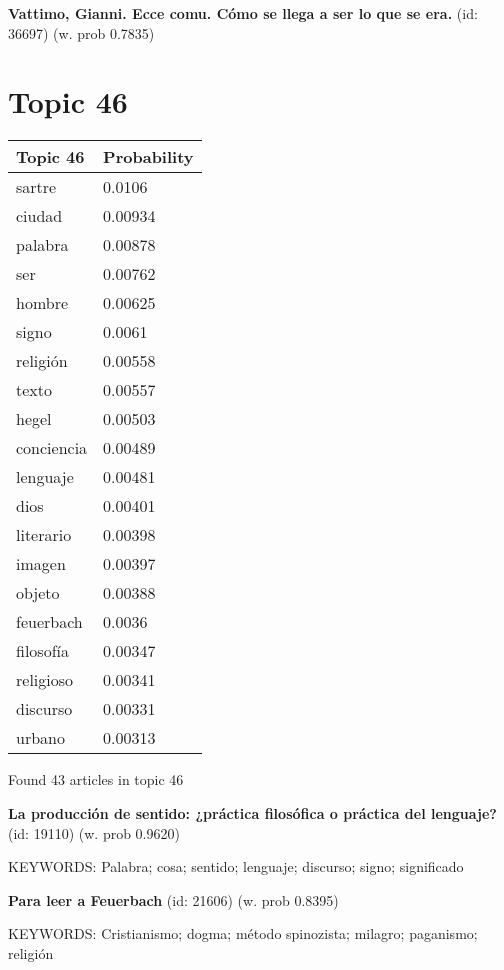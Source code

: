 \documentclass{article}
\begin{document}
\textbf{Vattimo, Gianni. Ecce comu. Cómo se llega a ser lo que se era.} (id: 36697)
 (w. prob 0.7835)

\vfill
\newpage


\centering
\thispagestyle{empty}
\section*{Topic 46}\vfill
\begin{tabular}{ll}
\toprule
   Topic 46 & Probability \\
\midrule
     sartre &      0.0106 \\
     ciudad &     0.00934 \\
    palabra &     0.00878 \\
        ser &     0.00762 \\
     hombre &     0.00625 \\
      signo &      0.0061 \\
   religión &     0.00558 \\
      texto &     0.00557 \\
      hegel &     0.00503 \\
 conciencia &     0.00489 \\
   lenguaje &     0.00481 \\
       dios &     0.00401 \\
  literario &     0.00398 \\
     imagen &     0.00397 \\
     objeto &     0.00388 \\
  feuerbach &      0.0036 \\
  filosofía &     0.00347 \\
  religioso &     0.00341 \\
   discurso &     0.00331 \\
     urbano &     0.00313 \\
\bottomrule
\end{tabular}

\vfill
Found 43 articles in topic 46
\vfill

\textbf{La producción de sentido: ¿práctica filosófica o práctica del lenguaje?} (id: 19110)
 (w. prob 0.9620)


KEYWORDS:
Palabra; cosa; sentido; lenguaje; discurso; signo; significado
\vfill

\textbf{Para leer a Feuerbach} (id: 21606)
 (w. prob 0.8395)


KEYWORDS:
Cristianismo; dogma; método spinozista; milagro; paganismo; religión
\vfill
\end{document}
